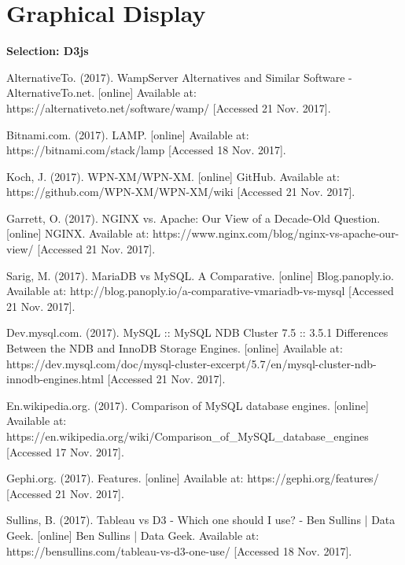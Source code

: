 \documentclass[letterpaper,10pt,titlepage]{article}
\begin{document}
\section{Graphical Display}


\textbf{Selection: D3js}
\clearpage

\begin{thebibliography}{9}

AlternativeTo. (2017). WampServer Alternatives and Similar Software - AlternativeTo.net. [online] Available at: https://alternativeto.net/software/wamp/ [Accessed 21 Nov. 2017].

Bitnami.com. (2017). LAMP. [online] Available at: https://bitnami.com/stack/lamp [Accessed 18 Nov. 2017].

Koch, J. (2017). WPN-XM/WPN-XM. [online] GitHub. Available at: https://github.com/WPN-XM/WPN-XM/wiki [Accessed 21 Nov. 2017].

Garrett, O. (2017). NGINX vs. Apache: Our View of a Decade-Old Question. [online] NGINX. Available at: https://www.nginx.com/blog/nginx-vs-apache-our-view/ [Accessed 21 Nov. 2017].

Sarig, M. (2017). MariaDB vs MySQL. A Comparative. [online] Blog.panoply.io. Available at: http://blog.panoply.io/a-comparative-vmariadb-vs-mysql [Accessed 21 Nov. 2017].

 Dev.mysql.com. (2017). MySQL :: MySQL NDB Cluster 7.5 :: 3.5.1 Differences Between the NDB and InnoDB Storage Engines. [online] Available at: https://dev.mysql.com/doc/mysql-cluster-excerpt/5.7/en/mysql-cluster-ndb-innodb-engines.html [Accessed 21 Nov. 2017].

En.wikipedia.org. (2017). Comparison of MySQL database engines. [online] Available at: https://en.wikipedia.org/wiki/Comparison\_of\_MySQL\_database\_engines [Accessed 17 Nov. 2017].

Gephi.org. (2017). Features. [online] Available at: https://gephi.org/features/ [Accessed 21 Nov. 2017].

Sullins, B. (2017). Tableau vs D3 - Which one should I use? - Ben Sullins | Data Geek. [online] Ben Sullins | Data Geek. Available at: https://bensullins.com/tableau-vs-d3-one-use/ [Accessed 18 Nov. 2017].

\end{thebibliography}
\end{document}
